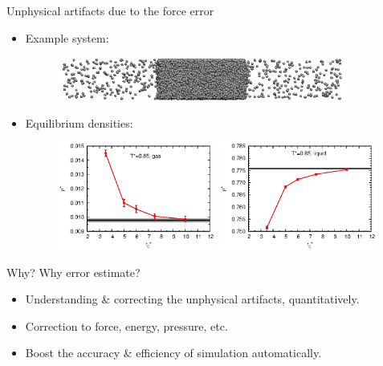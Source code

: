 \documentclass{beamer}
\newcommand{\redc}[1]{{\color{red} #1}}
\begin{document}
\begin{frame}{Unphysical artifacts due to the force error}
  \begin{itemize}\itemsep 10pt
  \item Example system:
    \begin{figure}
      \centering
      \includegraphics[width=0.9\textwidth]{figs/t0.85-n16000-rc07.5uni/confout-02.eps}
    \end{figure}
  \item Equilibrium densities:
    \begin{figure}
    \centering
    \includegraphics[width=0.49\textwidth]{figs/converge.new/t0p85-gas-1.eps} 
    \includegraphics[width=0.49\textwidth]{figs/converge.new/t0p85-liquid-1.eps} 
  \end{figure}  
  \end{itemize}
\end{frame}

\begin{frame}{Why?}
  Why error estimate?
  \begin{itemize}\itemsep 3pt
  \item <2->Understanding \& correcting
    the unphysical artifacts, quantitatively.
  \item <3->Correction to \redc{force, energy, pressure, etc.}
  \item <4->Boost the accuracy \& efficiency of simulation automatically.
  \end{itemize}  
  \vfill
\end{frame}
\end{document}
